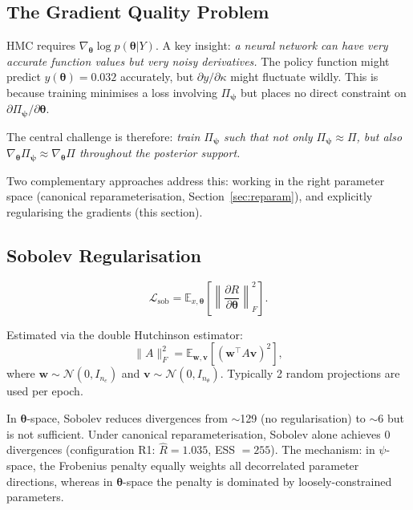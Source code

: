 \documentclass[11pt,a4paper]{article}
\theoremstyle{definition}
\newcommand{\E}{\mathbb{E}}
\newcommand{\btheta}{\boldsymbol{\theta}}
\newcommand{\bpsi}{\boldsymbol{\psi}}
\newcommand{\bv}{\mathbf{v}}
\newcommand{\bw}{\mathbf{w}}
\begin{document}
	\subsection{The Gradient Quality Problem}
	\label{sec:gradient_problem}
	
	HMC requires $\nabla_{\btheta} \log p(\btheta|Y)$.
	A key insight: \emph{a neural network can have very accurate function values but very noisy derivatives.}
	The policy function might predict $y(\btheta) = 0.032$ accurately, but $\partial y/\partial \kappa$ might fluctuate wildly.
	This is because training minimises a loss involving $\Pi_{\bpsi}$ but places no direct constraint on $\partial\Pi_{\bpsi}/\partial\btheta$.
	
	The central challenge is therefore: \emph{train $\Pi_{\bpsi}$ such that not only $\Pi_{\bpsi} \approx \Pi$, but also $\nabla_{\btheta} \Pi_{\bpsi} \approx \nabla_{\btheta} \Pi$ throughout the posterior support.}
	
	Two complementary approaches address this: working in the right parameter space (canonical reparameterisation, Section~\ref{sec:reparam}), and explicitly regularising the gradients (this section).
	
	\subsection{Sobolev Regularisation}
	\label{sec:sobolev}
	
	\begin{equation}\label{eq:sobolev}
		\mathcal{L}_{\mathrm{sob}} = \E_{x,\btheta}\!\left[\left\|\frac{\partial R}{\partial \btheta}\right\|_F^2\right].
	\end{equation}
	
	Estimated via the double Hutchinson estimator:
	\begin{equation}\label{eq:double_hutch}
		\|A\|_F^2 = \E_{\bw,\bv}\!\left[\left(\bw^\top A \bv\right)^2\right],
	\end{equation}
	where $\bw \sim \mathcal{N}(0, I_{n_e})$ and $\bv \sim \mathcal{N}(0, I_{n_\theta})$.
	Typically 2 random projections are used per epoch.
	
	In $\btheta$-space, Sobolev reduces divergences from $\sim$129 (no regularisation) to $\sim$6 but is not sufficient.
	Under canonical reparameterisation, Sobolev alone achieves 0 divergences (configuration R1: $\hat{R} = 1.035$, ESS $= 255$).
	The mechanism: in $\psi$-space, the Frobenius penalty equally weights all decorrelated parameter directions, whereas in $\btheta$-space the penalty is dominated by loosely-constrained parameters.
	
\end{document}
